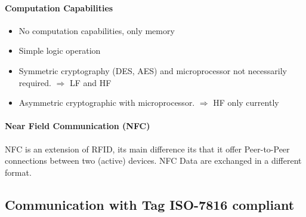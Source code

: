 \paragraph{Computation Capabilities}
\begin{itemize}
    \item No computation capabilities, only memory
    \item Simple logic operation
    \item Symmetric cryptography (DES, AES) and microprocessor not
        necessarily required. $\Rightarrow$ LF and HF
    \item Asymmetric cryptographic with microprocessor.
        $\Rightarrow$ HF only currently
\end{itemize}


\paragraph{Near Field Communication (NFC)}
NFC is an extension of RFID, its main difference its that it offer
Peer-to-Peer connections between two (active) devices. NFC Data are exchanged
in a different format.


\subsection{Communication with Tag \textsc{ISO-7816} compliant}

